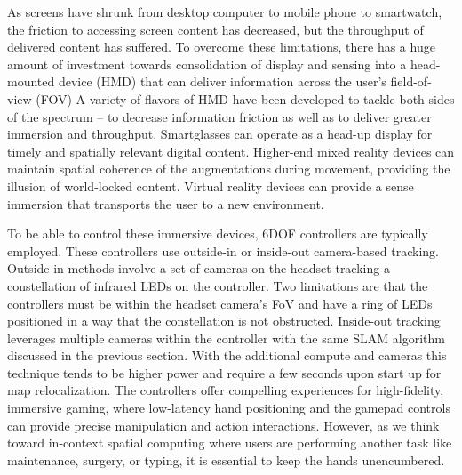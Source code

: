 \documentclass [11pt, proquest] {uwthesis}[2020/02/24]
\begin{document}
As screens have shrunk from desktop computer to mobile phone to smartwatch, the friction to accessing screen content has decreased, but the throughput of delivered content has suffered. To overcome these limitations, there has a huge amount of investment towards consolidation of display and sensing into a head-mounted device (HMD) that can deliver information across the user's field-of-view (FOV)%
A variety of flavors of HMD have been developed to tackle both sides of the spectrum -- to decrease information friction as well as to deliver greater immersion and throughput.
Smartglasses can operate as a head-up display for timely and spatially relevant digital content. Higher-end mixed reality devices can maintain spatial coherence of the augmentations during movement, providing the illusion of world-locked content. Virtual reality devices can provide a sense immersion that transports the user to a new environment.

To be able to control these immersive devices, 6DOF controllers are typically employed. These controllers use outside-in or inside-out camera-based tracking. Outside-in methods involve a set of cameras on the headset tracking a constellation of infrared LEDs on the controller. Two limitations are that the controllers must be within the headset camera's FoV and have a ring of LEDs positioned in a way that the constellation is not obstructed. Inside-out tracking leverages multiple cameras within the controller with the same SLAM algorithm discussed in the previous section. With the additional compute and cameras this technique tends to be higher power and require a few seconds upon start up for map relocalization. The controllers offer compelling experiences for high-fidelity, immersive gaming, where low-latency hand positioning and the gamepad controls can provide precise manipulation and action interactions. However, as we think toward in-context spatial computing where users are performing another task like maintenance, surgery, or typing, it is essential to keep the hands unencumbered.
\end{document}
